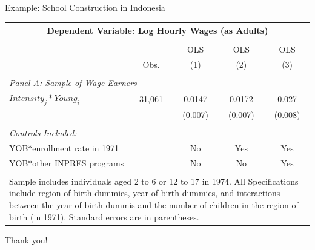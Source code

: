 \documentclass[10pt,xcolor=table,ignorenonframetext,aspectratio=169]{beamer}
\begin{document}

\begin{frame}{Example:  School Construction in Indonesia}

\medskip
\begin{center}
\begin{footnotesize}
\begin{tabular}{lcccc}
	\multicolumn{5}{c}{\textbf{Dependent Variable:  Log Hourly Wages (as Adults)}} \\ [0.6ex]
	\hline \hline
	& & & & \\ [-2.2ex]
	&         & OLS   & OLS & OLS \\ [0.6ex]
	& Obs.     & (1)   & (2) & (3) \\ [0.6ex]
	\hline
	& & & & \\ [-2.2ex]
	\multicolumn{5}{l}{\textit{Panel A:  Sample of Wage Earners}} \\ [0.6ex]
	$Intensity_j * Young_i$ & 31,061    &  0.0147    & 0.0172 & 0.027 \\ [0.6ex]
	&           & (0.007)   & (0.007)   & (0.008) \\ [0.6ex]
	\hline
	& & & & \\ [-2.2ex]
	\multicolumn{5}{l}{\textit{Controls Included:}} \\ [0.6ex]
	YOB$*$enrollment rate in 1971   &  & No & Yes & Yes \\ [0.6ex]
	YOB$*$other INPRES programs   &  & No & No & Yes \\ [0.6ex]
	\hline
	& & & & \\ [-2.2ex]
	\multicolumn{5}{p{9.4cm}}{\scriptsize{Sample includes individuals aged 2 to 6 or 12 to 17 in 1974.  All Specifications include region of birth dummies, year of birth dummies, and interactions between the year of birth dummis and the number of children in the region of birth (in 1971).  Standard errors are in parentheses.}}
\end{tabular}
\end{footnotesize}
\end{center}

\end{frame}




\begin{frame}[plain]

	
	\begin{center}
		
		\Large{\textcolor{williams}{Thank you!}}
		
	\end{center}
	
\end{frame}
\end{document}
